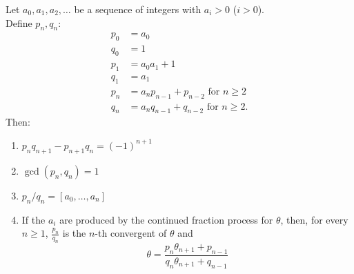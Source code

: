 \documentclass[NumTh.tex]{subfiles}
\begin{document}
\begin{lemma}
  Let $a_0,a_1,a_2,\dots$ be a sequence of integers with $a_i > 0$ ($i>0$).\\
  Define $p_n,q_n$:
  \begin{align}
    p_0 &= a_0\\
    q_0 &= 1\\
    p_1 &= a_0 a_1 + 1\\
    q_1 &= a_1\\
    p_n &= a_n p_{n-1} + p_{n - 2} \text{ for } n \geq 2\\
    q_n &= a_n q_{n-1} + q_{n-2} \text{ for } n \geq 2.
  \end{align}
  Then:
  \begin{enumerate} %
    \item $p_n q_{n+1} - p_{n+1} q_n = (-1)^{n+1}$
    \item $\gcd(p_n,q_n) = 1$
    \item $p_n/q_n = [a_0,\dots,a_n]$
    \item If the $a_i$ are produced by the continued fraction process for $\theta$, then, for every $n \geq 1$, $\frac{p_n}{q_n}$ is the $n$-th convergent of $\theta$ and
    \[ \theta = \frac{p_n \theta_{n+1} + p_{n-1}}{q_n \theta_{n+1} + q_{n-1}} \]
  \end{enumerate}
\end{lemma}
\end{document}
